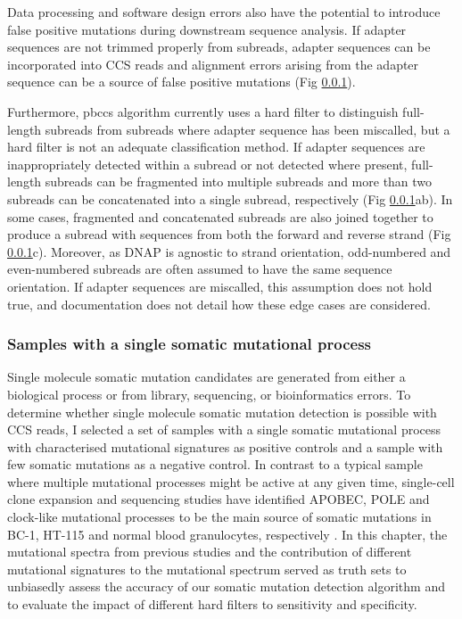 Data processing and software design errors also have the potential to introduce false positive mutations during downstream sequence analysis. If adapter sequences are not trimmed properly from subreads, adapter sequences can be incorporated into CCS reads and alignment errors arising from the adapter sequence can be a source of false positive mutations (Fig \ref{}). 


%

Furthermore, pbccs algorithm currently uses a hard filter to distinguish full-length subreads from subreads where adapter sequence has been miscalled, but a hard filter is not an adequate classification method.  If adapter sequences are inappropriately detected within a subread or not detected where present, full-length subreads can be fragmented into multiple subreads and more than two subreads can be concatenated into a single subread, respectively (Fig \ref{}ab). In some cases, fragmented and concatenated subreads are also joined together to produce a subread with sequences from both the forward and reverse strand (Fig \ref{}c). Moreover, as DNAP is agnostic to strand orientation, odd-numbered and even-numbered subreads are often assumed to have the same sequence orientation. If adapter sequences are miscalled, this assumption does not hold true, and documentation does not detail how these edge cases are considered.

\subsubsection{Samples with a single somatic mutational process}

Single molecule somatic mutation candidates are generated from either a biological process or from library, sequencing, or bioinformatics errors. To determine whether single molecule somatic mutation detection is possible with CCS reads, I selected a set of samples with a single somatic mutational process with characterised mutational signatures as positive controls and a sample with few somatic mutations as a negative control. In contrast to a typical sample where multiple mutational processes might be active at any given time, single-cell clone expansion and sequencing studies have identified APOBEC, POLE and clock-like mutational processes to be the main source of somatic mutations in BC-1, HT-115 and normal blood granulocytes, respectively \cite{Petljak2019-wi, Mitchell2022-ry}. In this chapter, the mutational spectra from previous studies and the contribution of different mutational signatures to the mutational spectrum served as truth sets to unbiasedly assess the accuracy of our somatic mutation detection algorithm and to evaluate the impact of different hard filters to sensitivity and specificity.

